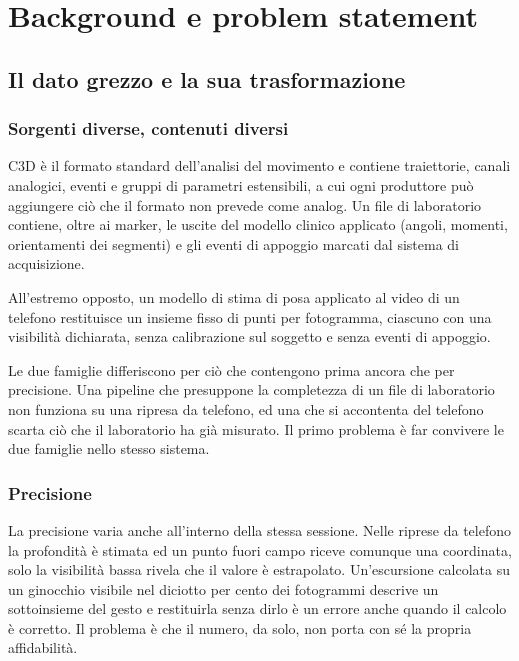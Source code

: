\chapter{Background e problem statement}
\label{chap:background}

\section{Il dato grezzo e la sua trasformazione}
\label{sec:ch2:dato}

\subsection{Sorgenti diverse, contenuti diversi}
\label{subsec:ch2:sorgenti}

C3D è il formato standard dell'analisi del movimento e contiene traiettorie, canali analogici, eventi e gruppi di parametri
estensibili, a cui ogni produttore può aggiungere ciò che il formato non prevede come analog. Un
file di laboratorio contiene, oltre ai marker, le uscite del modello clinico
applicato (angoli, momenti, orientamenti dei segmenti) e gli eventi di appoggio
marcati dal sistema di acquisizione.

All'estremo opposto, un modello di stima di posa applicato al video di un
telefono restituisce un insieme fisso di punti per fotogramma, ciascuno con una
visibilità dichiarata, senza calibrazione sul soggetto e senza eventi di
appoggio.

Le due famiglie differiscono per ciò che contengono prima ancora che per
precisione. Una pipeline che presuppone la completezza di un file di laboratorio
non funziona su una ripresa da telefono, ed una che si accontenta del telefono
scarta ciò che il laboratorio ha già misurato. Il primo problema è far convivere
le due famiglie nello stesso sistema.

\subsection{Precisione}
\label{subsec:ch2:precisione}

La precisione varia anche all'interno della stessa sessione. Nelle riprese da telefono la
profondità è stimata ed un punto fuori campo riceve comunque una coordinata, solo
la visibilità bassa rivela che il valore è estrapolato. Un'escursione calcolata
su un ginocchio visibile nel diciotto per cento dei fotogrammi descrive un
sottoinsieme del gesto e restituirla senza dirlo è un errore anche quando il
calcolo è corretto. Il problema è che il numero, da solo, non porta con sé la
propria affidabilità.

